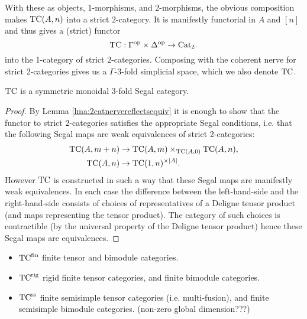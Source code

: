 \documentclass{amsart}
\begin{document}
With these as objects, 1-morphisms, and 2-morphisms, the obvious composition makes $\mathrm{TC}(A,n)$ into a strict $2$-category. It is manifestly functorial in $A$ and $[n]$ and thus gives a (strict) functor 
\begin{equation*}
	\mathrm{TC}: \Gamma^\textrm{op} \times \Delta^\textrm{op} \to \mathrm{Cat}_2.
\end{equation*}
into the 1-category of strict 2-categories. Composing with the coherent nerve for strict 2-categories gives us a $\Gamma$-3-fold simplicial space, which we also denote $\mathrm{TC}$.

\begin{theorem}
	 $\mathrm{TC}$ is a symmetric monoidal 3-fold Segal category.  
\end{theorem}

\begin{proof}
	By Lemma \ref{lma:2catnervereflectsequiv} it is enough to show that the functor to strict 2-categories satisfies the appropriate Segal conditions, i.e. that the following Segal maps are weak equivalences of strict 2-categories:
	\begin{align*}
		\mathrm{TC}(A, m + n) & \to \mathrm{TC}(A, m) \times_{\mathrm{TC}(A, 0)} \mathrm{TC}(A, n), \\
		\mathrm{TC}(A, n) & \to \mathrm{TC}(1, n)^{\times |A|}. 
	\end{align*}
However $\mathrm{TC}$ is constructed in such a way that these Segal maps are manifestly weak equivalences. In each case the difference between the left-hand-side and the right-hand-side consists of choices of representatives of a Deligne tensor product (and maps representing the tensor product). The category of such choices is contractible (by the universal property of the Deligne tensor product) hence these Segal maps are equivalences. 
\end{proof}
 


\begin{itemize}
	\item ${\mathrm{TC}^{\text{fin}}}$  finite tensor and bimodule categories.
	\item ${\mathrm{TC}^{\text{rig}}}$ rigid finite tensor categories, and finite bimodule categories. 
	\item ${\mathrm{TC}^{\text{ss}}}$  finite semisimple tensor categories (i.e. multi-fusion), and finite semisimple bimodule categories. (non-zero global dimension???)
\end{itemize}
\end{document}
